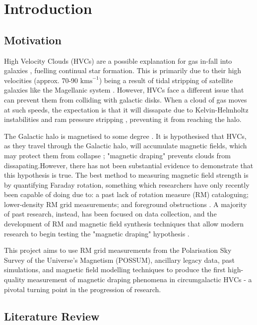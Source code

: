 \chapter{Introduction}
\label{cha:introduction}

\section{Motivation}
\label{sec:motivation}
High Velocity Clouds (HVCs) are a possible explanation for gas in-fall into galaxies \cite{ID7}, fuelling continual star formation. This is primarily due to their high velocities (approx. 70-90 $\mathrm{kms}^{-1}$) being a result of tidal stripping of satellite galaxies like the Magellanic system \cite{ID7, ID8}. However, HVCs face a different issue that can prevent them from colliding with galactic disks. When a cloud of gas moves at such speeds, the expectation is that it will dissapate due to Kelvin-Helmholtz instabilities and ram pressure stripping \cite{ID23, ID33, ID11}, preventing it from reaching the halo.

The Galactic halo is magnetised to some degree \cite{ID30}. It is hypothesised that HVCs, as they travel through the Galactic halo, will accumulate magnetic fields, which may protect them from collapse \cite{ID10, ID11, ID13, ID23, ID24, ID34}; "magnetic draping" prevents clouds from dissapating.However, there has not been substantial evidence to demonstrate that this hypothesis is true. The best method to measuring magnetic field strength is by quantifying Faraday rotation, something which researchers have only recently been  capable of doing due to: a past lack of rotation measure (RM) cataloguing; lower-density RM grid measurements; and foreground obstructions \cite{ID2, ID18, ID36}. A majority of past research, instead, has been focused on data collection, and the development of RM and magnetic field synthesis techniques that allow modern research to begin testing the "magnetic draping" hypothesis \cite{ID18, ID1, ID3, ID6, ID5, ID30, ID26}.

This project aims to use RM grid measurements from the Polarisation Sky Survey of the Universe's Magnetism (POSSUM), ancillary legacy data, past simulations, and magnetic field modelling techniques to produce the first high-quality measurement of magnetic draping phenomena in circumgalactic HVCs - a pivotal turning point in the progression of research.

\section{Literature Review}
\label{sec:lit-review}

